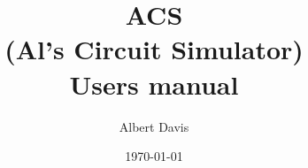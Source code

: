 
\title{ACS \\ (Al's Circuit Simulator) \\ Users manual}

\author{Albert Davis}

\date{\today}

\maketitle
